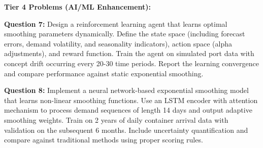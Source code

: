 \documentclass{article}
\begin{document}
\textbf{Tier 4 Problems (AI/ML Enhancement):}

\textbf{Question 7:} Design a reinforcement learning agent that learns optimal smoothing parameters dynamically. Define the state space (including forecast errors, demand volatility, and seasonality indicators), action space (alpha adjustments), and reward function. Train the agent on simulated port data with concept drift occurring every 20-30 time periods. Report the learning convergence and compare performance against static exponential smoothing.

\textbf{Question 8:} Implement a neural network-based exponential smoothing model that learns non-linear smoothing functions. Use an LSTM encoder with attention mechanism to process demand sequences of length 14 days and output adaptive smoothing weights. Train on 2 years of daily container arrival data with validation on the subsequent 6 months. Include uncertainty quantification and compare against traditional methods using proper scoring rules.
\end{document}
